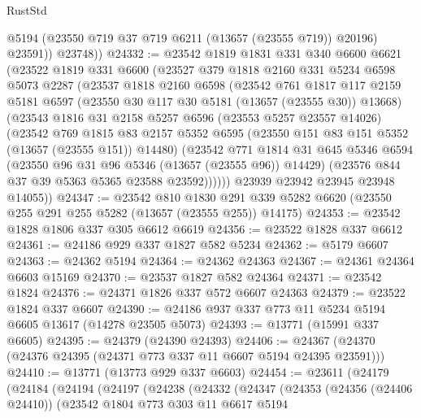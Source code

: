 \begin{lexlean}{RustStd}
\begin{coremodule}
            @5194
            (@23550 @719 @37 @719 @6211 (@13657 (@23555 @719)) @20196)
            @23591))
        @23748))
@24332 := @23542
    @1819
    @1831
    @331
    @340
    @6600
    @6621
    (@23522
      @1819
      @331
      @6600
      (@23527
        @379
        @1818
        @2160
        @331
        @5234
        @6598
        @5073
        @2287
        (@23537
          @1818
          @2160
          @6598
          (@23542
            @761
            @1817
            @117
            @2159
            @5181
            @6597
            (@23550 @30 @117 @30 @5181 (@13657 (@23555 @30)) @13668)
            (@23543
              @1816
              @31
              @2158
              @5257
              @6596
              (@23553 @5257 @23557 @14026)
              (@23542
                @769
                @1815
                @83
                @2157
                @5352
                @6595
                (@23550 @151 @83 @151 @5352 (@13657 (@23555 @151)) @14480)
                (@23542
                  @771
                  @1814
                  @31
                  @645
                  @5346
                  @6594
                  (@23550 @96 @31 @96 @5346 (@13657 (@23555 @96)) @14429)
                  (@23576 @844 @37 @39 @5363 @5365 @23588 @23592))))))
        @23939
        @23942
        @23945
        @23948
        @14055))
@24347 := @23542
    @810
    @1830
    @291
    @339
    @5282
    @6620
    (@23550 @255 @291 @255 @5282 (@13657 (@23555 @255)) @14175)
@24353 := @23542 @1828 @1806 @337 @305 @6612 @6619
@24356 := @23522 @1828 @337 @6612
@24361 := @24186 @929 @337 @1827 @582 @5234
@24362 := @5179 @6607
@24363 := @24362 @5194
@24364 := @24362 @24363
@24367 := @24361 @24364 @6603 @15169
@24370 := @23537 @1827 @582 @24364
@24371 := @23542 @1824
@24376 := @24371 @1826 @337 @572 @6607 @24363
@24379 := @23522 @1824 @337 @6607
@24390 := @24186 @937 @337 @773 @11 @5234 @5194 @6605 @13617 (@14278 @23505 @5073)
@24393 := @13771 (@15991 @337 @6605)
@24395 := @24379 (@24390 @24393)
@24406 := @24367 (@24370 (@24376 @24395 (@24371 @773 @337 @11 @6607 @5194 @24395 @23591)))
@24410 := @13771 (@13773 @929 @337 @6603)
@24454 := @23611
    (@24179
      (@24184
        (@24194
          (@24197
            (@24238
              (@24332
                (@24347
                  (@24353
                    (@24356 (@24406 @24410))
                    (@23542
                      @1804
                      @773
                      @303
                      @11
                      @6617
                      @5194

\end{coremodule}
\end{lexlean}
